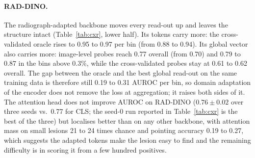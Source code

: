 \documentclass[10pt,letterpaper,twocolumn]{article}
\begin{document}
\paragraph{RAD-DINO.}
The radiograph-adapted backbone moves every read-out up and leaves the structure intact
(Table~\ref{tab:cxr}, lower half). Its tokens carry more: the cross-validated oracle rises to
0.95 to 0.97 per bin (from 0.88 to 0.94). Its global vector also carries more: image-level
probes reach 0.77 overall (from 0.70) and 0.79 to 0.87 in the bins above 0.3\%, while the
cross-validated probes stay at 0.61 to 0.62 overall. The gap between the oracle and the best
global read-out on the same training data is therefore still 0.19 to 0.31 AUROC per bin, so
domain adaptation of the encoder does not remove the loss at aggregation; it raises both
sides of it. The attention head does not improve AUROC on RAD-DINO ($0.76\pm0.02$ over three seeds vs.\ 0.77 for CLS; the seed-0 run reported in Table~\ref{tab:cxr} is the best of the three) but localises better than on any other backbone, with attention mass on small lesions 21 to 24
times chance and pointing accuracy 0.19 to 0.27, which suggests the adapted tokens make the
lesion easy to find and the remaining difficulty is in scoring it from a few hundred positives.
\end{document}
